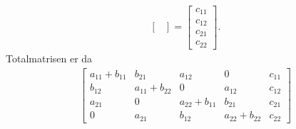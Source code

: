 \documentclass[11pt, a4paper, norsk]{NTNUoving}
\begin{document}
\begin{oppgave}[4]
\begin{punkt}
\begin{align*}
\begin{bmatrix}
            \end{bmatrix}
            =
            \begin{bmatrix}
                c_{11}\\
                c_{12}\\
                c_{21}\\
                c_{22}
            \end{bmatrix}.
        \end{align*}
        Totalmatrisen er da
        \begin{align*}
            \left[
                \begin{array}{cccc|c}
                    a_{11}+b_{11} & b_{21} & a_{12} & 0 & c_{11}\\
                    b_{12} & a_{11}+b_{22} & 0 & a_{12} & c_{12}\\
                    a_{21} & 0 & a_{22}+b_{11} & b_{21} & c_{21}\\
                    0 & a_{21} & b_{12} & a_{22} + b_{22} & c_{22}
                \end{array}
            \right]     
        \end{align*}
    \end{punkt}
    

\end{oppgave}
\end{document}
